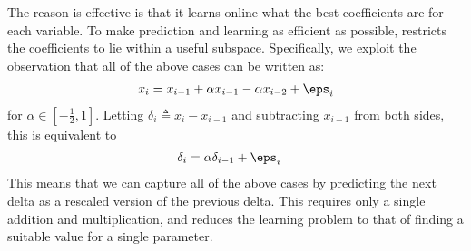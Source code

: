 The reason \fire is effective is that it learns online what the best coefficients are for each variable.
To make prediction and learning as efficient as possible, \justfire \text{} restricts the coefficients to lie within a useful subspace. Specifically, we exploit the observation that all of the above cases can be written as:
\begin{align}
    x_i = x_{i-1} + \alpha x_{i-1} - \alpha x_{i-2} + \eps_i
\end{align}
for $\alpha \in [-\frac{1}{2}, 1]$. Letting $\delta_i \triangleq x_i - x_{i-1}$ and subtracting $x_{i-1}$ from both sides, this is equivalent to
\begin{align}
    \delta_i &= \alpha \delta_{i-1} + \eps_i
\end{align}
This means that we can capture all of the above cases by predicting the next delta as a rescaled version of the previous delta. This requires only a single addition and multiplication, and reduces the learning problem to that of finding a suitable value for a single parameter.


